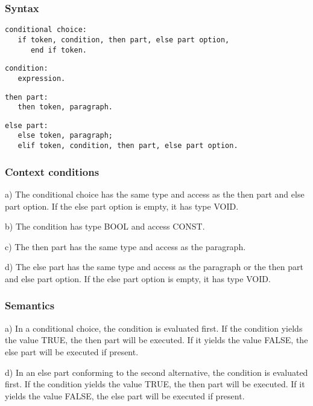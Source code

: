 \documentclass [a4paper,12pt,fleqn]{article}
\begin{document}
\subsubsection*{Syntax}
\begin{letterlist}
\item
\begin{verbatim}
conditional choice:
   if token, condition, then part, else part option,
      end if token.
\end{verbatim}
\item
\begin{verbatim}
condition:
   expression.
\end{verbatim}
\item
\begin{verbatim}
then part:
   then token, paragraph.
\end{verbatim}
\item
\begin{verbatim}
else part:
   else token, paragraph;
   elif token, condition, then part, else part option.
\end{verbatim}
\end{letterlist}
\subsubsection*{Context conditions}
\begin{list}{-}{}
\item[a)]
The conditional choice has the same type and access as the then part
and else part option. If the else part option is empty, it has type VOID.
\item[b)]
The condition has type BOOL and access CONST.
\item[c)]
The then part has the same type and access as the paragraph.
\item[d)]
The else part has the same type and access as the paragraph
or the then part and else part option. If the else part option is
empty, it has type VOID.
\end{list}
\subsubsection*{Semantics}
\begin{list}{-}{}
\item[a)]
In a conditional choice, the condition is evaluated first. If the condition
yields the value TRUE, the then part will be executed. If it yields the
value FALSE, the else part will be executed if present.
\item[d)]
In an else part conforming to the second alternative, the condition is
evaluated first. If the condition yields the value TRUE, the then part will
be executed. If it yields the value FALSE, the else part will be executed if
present.
\end{list}
\end{document}
